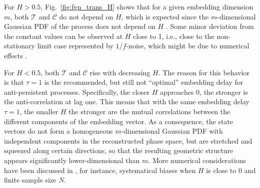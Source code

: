		For $H>0.5$, Fig.~\ref{fig:fgn_trans_H} shows that for a given embedding dimension $m$, both $\mathcal{T}$ and $\mathcal{C}$ do not depend on $H$, which is expected since the $m$-dimensional Gaussian PDF of the process does not depend on $H$ \cite{Donges2012,Zou2015}. Some minor deviation from the constant values can be observed at $H$ close to 1, i.e., close to the non-stationary limit case represented by $1/f$-noise, which might be due to numerical effects \cite{Zou2015}. 
		
		For $H<0.5$, both $\mathcal{T}$ and $\mathcal{C}$ rise with decreasing $H$. The reason for this behavior is that $\tau=1$ is the recommended, but still not ``optimal'' embedding delay for anti-persistent processes. Specifically, the closer $H$ approaches 0, the stronger is the anti-correlation at lag one. This means that with the same embedding delay $\tau=1$, the smaller $H$ the stronger are the mutual correlations between the different components of the embedding vector. As a consequence, the state vectors do not form a homogeneous $m$-dimensional Gaussian PDF with independent components in the reconstructed phase space, but are stretched and squeezed along certain directions, so that the resulting geometric structure appears significantly lower-dimensional than $m$. More numerical considerations have been discussed in \cite{Zou2015}, for instance, systematical biases when $H$ is close to $0$ and finite sample size $N$. 

